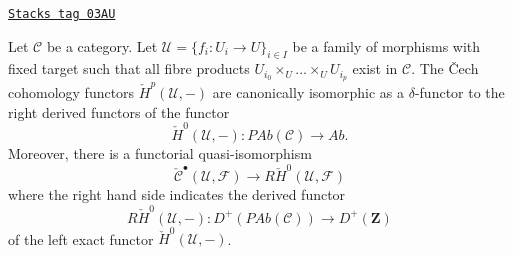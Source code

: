 \begin{lemma}
\label{sites-cohomology-lemma-cech-cohomology-derived-presheaves}
\href{https://stacks.math.columbia.edu/tag/03AU}{\texttt{Stacks tag 03AU}}

Let $\mathcal{C}$ be a category. Let
$\mathcal{U} = \{f_i : U_i \to U\}_{i \in I}$ be a family of morphisms
with fixed target such that all fibre products
$U_{i_0} \times_U \ldots \times_U U_{i_p}$ exist in $\mathcal{C}$.
The {\v C}ech cohomology functors $\check{H}^p(\mathcal{U}, -)$
are canonically isomorphic as a $\delta$-functor to
the right derived functors of the functor
$$
\check{H}^0(\mathcal{U}, -) :
\textit{PAb}(\mathcal{C})
\longrightarrow
\textit{Ab}.
$$
Moreover, there is a functorial quasi-isomorphism
$$
\check{\mathcal{C}}^\bullet(\mathcal{U}, \mathcal{F})
\longrightarrow
R\check{H}^0(\mathcal{U}, \mathcal{F})
$$
where the right hand side indicates the derived functor
$$
R\check{H}^0(\mathcal{U}, -) :
D^{+}(\textit{PAb}(\mathcal{C}))
\longrightarrow
D^{+}(\mathbf{Z})
$$
of the left exact functor $\check{H}^0(\mathcal{U}, -)$.
\end{lemma}

